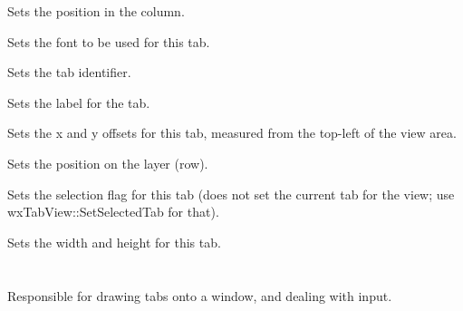 

Sets the position in the column.



Sets the font to be used for this tab.



Sets the tab identifier.



Sets the label for the tab.



Sets the x and y offsets for this tab, measured from the top-left of the view area.



Sets the position on the layer (row).



Sets the selection flag for this tab (does not set the current tab for the view;
use wxTabView::SetSelectedTab for that).



Sets the width and height for this tab.

\section{}\label{wxtabview}

Responsible for drawing tabs onto a window, and dealing with input.



